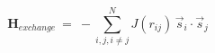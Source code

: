 \documentclass[preview]{standalone}
\begin{document}
\begin{varwidth}{50in}
  \begin{equation}
    \bm{H}_{exchange} ~=~ -\sum_{i,j,i\neq j}^{N} {J} \left(r_{ij} \right)\, \vec{s}_{i}\cdot \vec{s}_{j} \nonumber
  \end{equation}
\end{varwidth}
\end{document}

